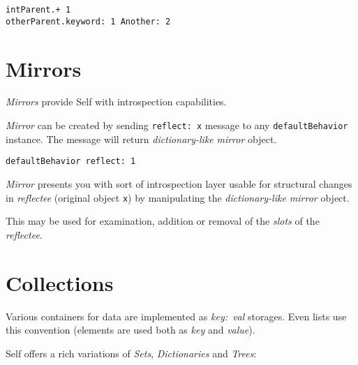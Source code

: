 \documentclass[10pt]{article}
\begin{document}
\begin{multicols*}{3}
\begin{lstlisting}
intParent.+ 1
otherParent.keyword: 1 Another: 2
\end{lstlisting}




\section{Mirrors}
\textit{Mirrors} provide Self with introspection capabilities.

\textit{Mirror} can be created by sending \texttt{reflect:\ x} message to any \texttt{defaultBehavior} instance. The message will return \textit{dictionary-like} \textit{mirror} object.

\begin{lstlisting}
defaultBehavior reflect: 1
\end{lstlisting}

\textit{Mirror} presents you with sort of introspection layer usable for structural changes in \textit{reflectee} (original object \texttt{x}) by manipulating the \textit{dictionary-like mirror} object.

This may be used for examination, addition or removal of the \textit{slots} of the \textit{reflectee}.




\vfill
\columnbreak
\section{Collections}
Various containers for data are implemented as \textit{key:\ val} storages. Even lists use this convention (elements are used both as \textit{key} and \textit{value}).

Self offers a rich variations of \textit{Sets}, \textit{Dictionaries} and \textit{Trees}:

\vspace*{0.4cm}


\end{multicols*}
\end{document}
